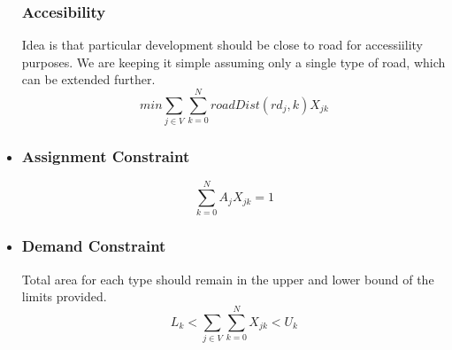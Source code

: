 \documentclass[twoside,10pt]{article}
\begin{document}
\begin{itemize}
\subsubsection*{Accesibility  }
Idea is that particular development should be close to road for accessiility purposes. We are keeping it simple assuming only a single type of road, which can be extended further.
 $$
 min\sum_{j \in V} \sum_{k=0}^N roadDist(rd_j,k)X_{jk}
 $$

\item
\subsubsection*{Assignment Constraint}
$$\sum_{k=0}^N A_j X_{jk} =1$$

\item
\subsubsection*{Demand Constraint  }
 Total area for each type should remain in the upper and lower bound of the limits provided.
$$ L_k < \sum_{j \in V} \sum_{k=0}^N X_{jk} < U_k $$
\end{itemize}
%
%
\end{document}
